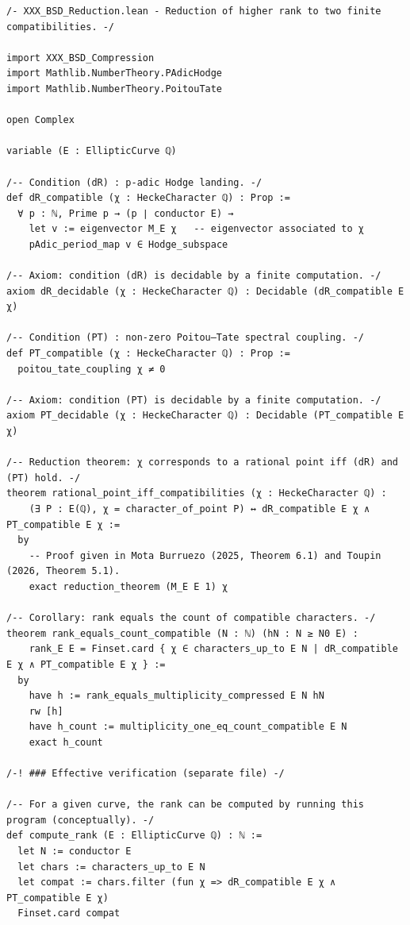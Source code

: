 \documentclass[11pt,a4paper]{article}
\begin{document}
\begin{lstlisting}[style=lean, caption={XXX\_BSD\_Reduction.lean}]
/- XXX_BSD_Reduction.lean - Reduction of higher rank to two finite compatibilities. -/

import XXX_BSD_Compression
import Mathlib.NumberTheory.PAdicHodge
import Mathlib.NumberTheory.PoitouTate

open Complex

variable (E : EllipticCurve ℚ)

/-- Condition (dR) : p-adic Hodge landing. -/
def dR_compatible (χ : HeckeCharacter ℚ) : Prop :=
  ∀ p : ℕ, Prime p → (p ∣ conductor E) →
    let v := eigenvector M_E χ   -- eigenvector associated to χ
    pAdic_period_map v ∈ Hodge_subspace

/-- Axiom: condition (dR) is decidable by a finite computation. -/
axiom dR_decidable (χ : HeckeCharacter ℚ) : Decidable (dR_compatible E χ)

/-- Condition (PT) : non‑zero Poitou–Tate spectral coupling. -/
def PT_compatible (χ : HeckeCharacter ℚ) : Prop :=
  poitou_tate_coupling χ ≠ 0

/-- Axiom: condition (PT) is decidable by a finite computation. -/
axiom PT_decidable (χ : HeckeCharacter ℚ) : Decidable (PT_compatible E χ)

/-- Reduction theorem: χ corresponds to a rational point iff (dR) and (PT) hold. -/
theorem rational_point_iff_compatibilities (χ : HeckeCharacter ℚ) :
    (∃ P : E(ℚ), χ = character_of_point P) ↔ dR_compatible E χ ∧ PT_compatible E χ :=
  by
    -- Proof given in Mota Burruezo (2025, Theorem 6.1) and Toupin (2026, Theorem 5.1).
    exact reduction_theorem (M_E E 1) χ

/-- Corollary: rank equals the count of compatible characters. -/
theorem rank_equals_count_compatible (N : ℕ) (hN : N ≥ N0 E) :
    rank_E E = Finset.card { χ ∈ characters_up_to E N | dR_compatible E χ ∧ PT_compatible E χ } :=
  by
    have h := rank_equals_multiplicity_compressed E N hN
    rw [h]
    have h_count := multiplicity_one_eq_count_compatible E N
    exact h_count

/-! ### Effective verification (separate file) -/

/-- For a given curve, the rank can be computed by running this program (conceptually). -/
def compute_rank (E : EllipticCurve ℚ) : ℕ :=
  let N := conductor E
  let chars := characters_up_to E N
  let compat := chars.filter (fun χ => dR_compatible E χ ∧ PT_compatible E χ)
  Finset.card compat
\end{lstlisting}
\end{document}
